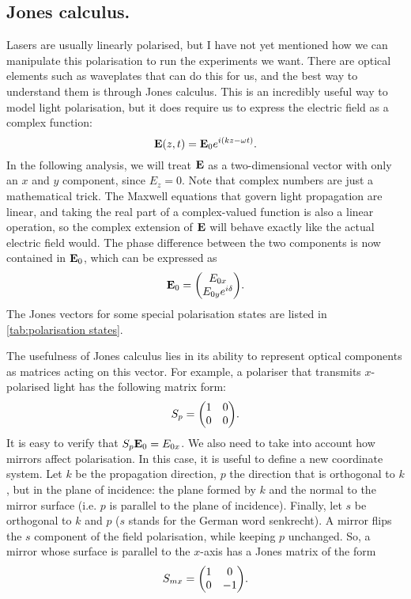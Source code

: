 \subsection{Jones calculus.} Lasers are usually linearly polarised, but I have not yet mentioned how we can manipulate this polarisation to run the experiments we want. There are optical elements such as waveplates that can do this for us, and the best way to understand them is through Jones calculus. This is an incredibly useful way to model light polarisation, but it does require us to express the electric field as a complex function:
\begin{equation}
	\vb{E}(z, t) = \vb{E}_0 e^{i(kz-\omega t)}.
	\label{eq:propagator}
\end{equation}
In the following analysis, we will treat $ \vb{E} $ as a two-dimensional vector with only an $ x $ and $ y $ component, since $ E_z = 0 $. Note that complex numbers are just a mathematical trick. The Maxwell equations that govern light propagation are linear, and taking the real part of a complex-valued function is also a linear operation, so the complex extension of $ \vb{E} $ will behave exactly like the actual electric field would. The phase difference between the two components is now contained in $ \vb{E}_0 $, which can be expressed as
\begin{equation}
	\vb{E}_0 = \mqty(\Eox \\ \Eoy e^{i\delta} ).
\end{equation}
The Jones vectors for some special polarisation states are listed in \autoref{tab:polarisation states}.

The usefulness of Jones calculus lies in its ability to represent optical components as matrices acting on this vector. For example, a polariser that transmits $ x $-polarised light has the following matrix form:
\begin{equation}
	S_p = \mqty(1 & 0 \\ 0 & 0).
\end{equation}
It is easy to verify that $ S_p \vb{E}_0 = E_{0x} $. We also need to take into account how mirrors affect polarisation. In this case, it is useful to define a new coordinate system. Let $ k $ be the propagation direction, $ p $ the direction that is orthogonal to $ k $, but in the plane of incidence: the plane formed by $ k $ and the normal to the mirror surface (i.e. $ p $ is parallel to the plane of incidence). Finally, let $ s $ be orthogonal to $ k $ and $ p $ ($ s $ stands for the German word senkrecht). A mirror flips the $ s $ component of the field polarisation, while keeping $ p $ unchanged. So, a mirror whose surface is parallel to the $ x $-axis has a Jones matrix of the form
\begin{equation}
	S_{mx} = \mqty(1 & 0 \\ 0 & -1).
\end{equation}

